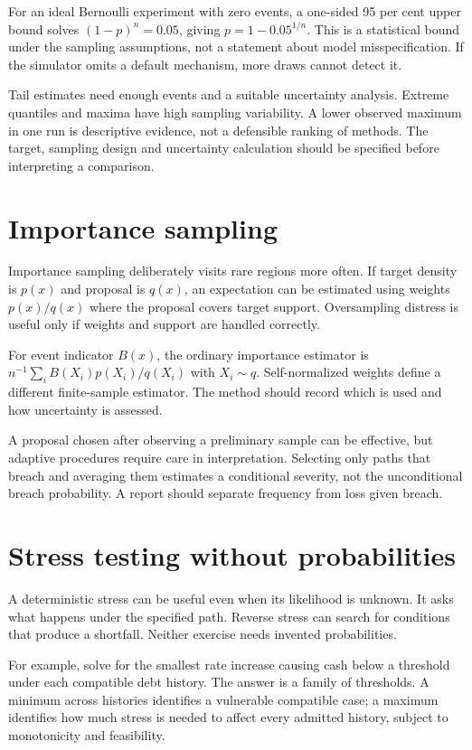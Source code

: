 For an ideal Bernoulli experiment with zero events, a one-sided 95 per cent upper bound solves $(1-p)^n=0.05$, giving $p=1-0.05^{1/n}$. This is a statistical bound under the sampling assumptions, not a statement about model misspecification. If the simulator omits a default mechanism, more draws cannot detect it.

Tail estimates need enough events and a suitable uncertainty analysis. Extreme quantiles and maxima have high sampling variability. A lower observed maximum in one run is descriptive evidence, not a defensible ranking of methods. The target, sampling design and uncertainty calculation should be specified before interpreting a comparison.

\section{Importance sampling}
Importance sampling deliberately visits rare regions more often. If target density is $p(x)$ and proposal is $q(x)$, an expectation can be estimated using weights $p(x)/q(x)$ where the proposal covers target support. Oversampling distress is useful only if weights and support are handled correctly.

For event indicator $B(x)$, the ordinary importance estimator is $n^{-1}\sum_i B(X_i)p(X_i)/q(X_i)$ with $X_i\sim q$. Self-normalized weights define a different finite-sample estimator. The method should record which is used and how uncertainty is assessed.

A proposal chosen after observing a preliminary sample can be effective, but adaptive procedures require care in interpretation. Selecting only paths that breach and averaging them estimates a conditional severity, not the unconditional breach probability. A report should separate frequency from loss given breach.

\section{Stress testing without probabilities}
A deterministic stress can be useful even when its likelihood is unknown. It asks what happens under the specified path. Reverse stress can search for conditions that produce a shortfall. Neither exercise needs invented probabilities.

For example, solve for the smallest rate increase causing cash below a threshold under each compatible debt history. The answer is a family of thresholds. A minimum across histories identifies a vulnerable compatible case; a maximum identifies how much stress is needed to affect every admitted history, subject to monotonicity and feasibility.

